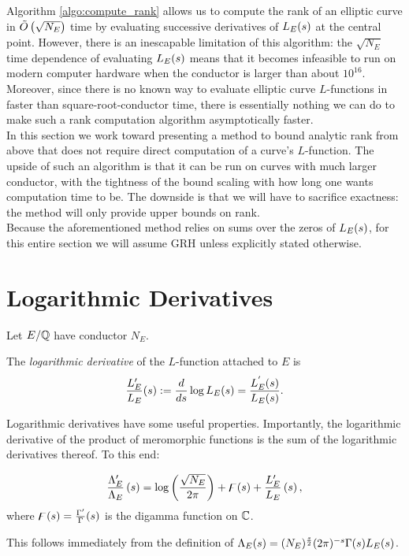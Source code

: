 
Algorithm \ref{algo:compute_rank} allows us to compute the rank of an elliptic curve in $\tilde{O}\left(\sqrt{N_E}\right)$ time by evaluating successive derivatives of $L_E(s)$ at the central point. However, there is an inescapable limitation of this algorithm: the $\sqrt{N_E}$ time dependence of evaluating $L_E(s)$ means that it becomes infeasible to run on modern computer hardware when the conductor is larger than about $10^{16}$. Moreover, since there is no known way to evaluate elliptic curve $L$-functions in faster than square-root-conductor time, there is essentially nothing we can do to make such a rank computation algorithm asymptotically faster. \\

In this section we work toward presenting a method to bound analytic rank from above that does not require direct computation of a curve's $L$-function. The upside of such an algorithm is that it can be run on curves with much larger conductor, with the tightness of the bound scaling with how long one wants computation time to be. The downside is that we will have to sacrifice exactness: the method will only provide upper bounds on rank. \\

Because the aforementioned method relies on sums over the zeros of $L_E(s)$, for this entire section we will assume GRH unless explicitly stated otherwise.

\section{Logarithmic Derivatives}\label{sec:log_derivs}

Let $E/\mathbb{Q}$  have conductor $N_E$.
\begin{definition}
The {\it logarithmic derivative} of the $L$-function attached to $E$ is
\begin{equation}
\frac{L_E^{\prime}}{L_E}(s) := \frac{d}{ds} \log L_E(s) = \frac{L_E^{^{\prime}}(s)}{L_E(s)}.
\end{equation}
\end{definition}
Logarithmic derivatives have some useful properties. Importantly, the logarithmic derivative of the product of meromorphic functions is the sum of the logarithmic derivatives thereof. To this end:
\begin{proposition}
\begin{equation}\label{eqn:logderiv_relation}
\frac{\Lambda_E^{\prime}}{\Lambda_E}\left(s\right) = \log\left(\frac{\sqrt{N_E}}{2\pi}\right) + \digamma(s) + \frac{L_E^{\prime}}{L_E}\left(s\right),
\end{equation}
where $\digamma(s) = \frac{\Gamma^{\prime}}{\Gamma}(s)$ is the digamma function on $\mathbb{C}$.
\end{proposition}
This follows immediately from the definition of $\Lambda_E(s) = (N_E)^{\frac{s}{2}}(2\pi)^{-s}\Gamma(s)L_E(s)$. \\

